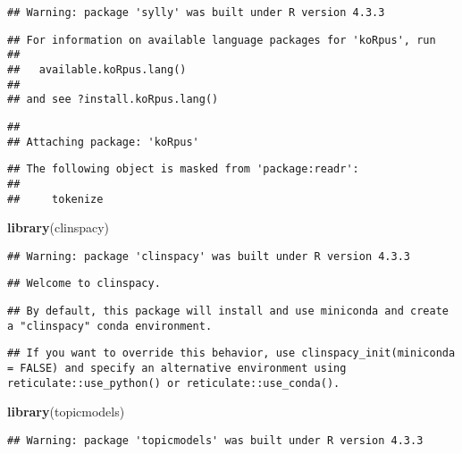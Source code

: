 \documentclass[
]{article}
\newenvironment{Shaded}{\begin{snugshade}}{\end{snugshade}}
\newcommand{\FunctionTok}[1]{\textcolor[rgb]{0.13,0.29,0.53}{\textbf{#1}}}
\newcommand{\NormalTok}[1]{#1}
\begin{document}
\begin{verbatim}
## Warning: package 'sylly' was built under R version 4.3.3
\end{verbatim}

\begin{verbatim}
## For information on available language packages for 'koRpus', run
## 
##   available.koRpus.lang()
## 
## and see ?install.koRpus.lang()
\end{verbatim}

\begin{verbatim}
## 
## Attaching package: 'koRpus'
\end{verbatim}

\begin{verbatim}
## The following object is masked from 'package:readr':
## 
##     tokenize
\end{verbatim}

\begin{Shaded}
\begin{Highlighting}[]
\FunctionTok{library}\NormalTok{(clinspacy)}
\end{Highlighting}
\end{Shaded}

\begin{verbatim}
## Warning: package 'clinspacy' was built under R version 4.3.3
\end{verbatim}

\begin{verbatim}
## Welcome to clinspacy.
\end{verbatim}

\begin{verbatim}
## By default, this package will install and use miniconda and create a "clinspacy" conda environment.
\end{verbatim}

\begin{verbatim}
## If you want to override this behavior, use clinspacy_init(miniconda = FALSE) and specify an alternative environment using reticulate::use_python() or reticulate::use_conda().
\end{verbatim}

\begin{Shaded}
\begin{Highlighting}[]
\FunctionTok{library}\NormalTok{(topicmodels)}
\end{Highlighting}
\end{Shaded}

\begin{verbatim}
## Warning: package 'topicmodels' was built under R version 4.3.3
\end{verbatim}
\end{document}
